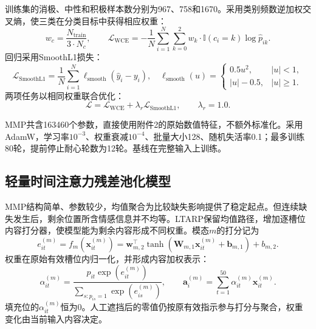\documentclass[UTF8,a4paper,11pt]{ctexart}
\newcommand{\QTwoParagraph}{\par\noindent\hspace*{2em}}
\newcounter{q2algorithm}
\begin{document}
\QTwoParagraph 训练集的消极、中性和积极样本数分别为967、758和1670。采用类别频数逆加权交叉熵，使三类在分类目标中获得相应权重：
\begin{equation}
w_c = \frac{N_{\mathrm{train}}}{3 \cdot N_c},\qquad
\mathcal L_{\mathrm{WCE}} = -\frac{1}{N}\sum_{i=1}^N \sum_{k=0}^2 w_k \cdot \mathbb I(c_i = k) \log \hat p_{ik}.
\end{equation}
回归采用SmoothL1损失：
\begin{equation}
\mathcal L_{\mathrm{SmoothL1}} = \frac{1}{N}\sum_{i=1}^N \ell_{\mathrm{smooth}}(\hat y_i - y_i),\quad
\ell_{\mathrm{smooth}}(u) = \begin{cases}
0.5 u^2, & |u| < 1,\\
|u| - 0.5, & |u| \ge 1.
\end{cases}
\end{equation}
两项任务以相同权重联合优化：
\begin{equation}
\mathcal L = \mathcal L_{\mathrm{WCE}} + \lambda_r \mathcal L_{\mathrm{SmoothL1}},\qquad \lambda_r = 1.0.
\label{eq:q2_loss_full}
\end{equation}

\QTwoParagraph MMP共含163460个参数，直接使用附件2的原始数值特征，不额外标准化。采用AdamW，学习率$10^{-3}$、权重衰减$10^{-4}$、批量大小128、随机失活率0.1；最多训练80轮，提前停止耐心轮数为12轮。基线在完整输入上训练。

\subsection{轻量时间注意力残差池化模型}\label{subsec:q2_pool}
\QTwoParagraph MMP结构简单、参数较少，均值聚合为比较缺失影响提供了稳定起点。但连续缺失发生后，剩余位置所含情感信息并不均等。LTARP保留均值路径，增加逐槽位内容打分器，使模型能为剩余内容形成不同权重。模态$m$的打分记为
\begin{equation}
e_{it}^{(m)} = f_m(\mathbf x_{it}^{(m)}) = \mathbf w_{m,2}^\top \tanh(\mathbf W_{m,1} \mathbf x_{it}^{(m)} + \mathbf b_{m,1}) + b_{m,2}.
\end{equation}
权重在原始有效槽位内归一化，并形成内容加权表示：
\begin{equation}
\alpha_{it}^{(m)} = \frac{p_{it}\exp(e_{it}^{(m)})}{\sum_{s: p_{is}=1} \exp(e_{is}^{(m)})},\qquad
\mathbf a_i^{(m)} = \sum_{t=1}^{50} \alpha_{it}^{(m)} \mathbf x_{it}^{(m)}.
\label{eq:q2_alpha_softmax}
\end{equation}
填充位的$\alpha_{it}^{(m)}$恒为0。人工遮挡后的零值仍按原有效指示参与打分与聚合，权重变化由当前输入内容决定。
\end{document}
